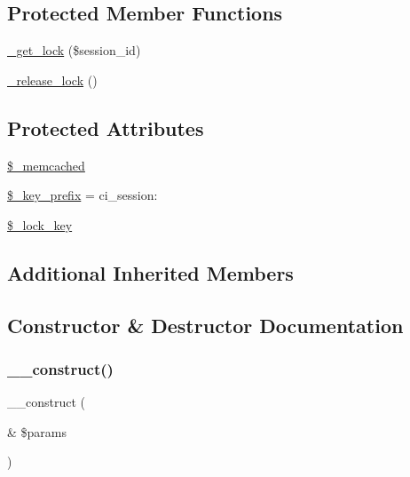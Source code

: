\subsection*{Protected Member Functions}
\begin{DoxyCompactItemize}
\item 
\mbox{\hyperlink{class_c_i___session__memcached__driver_a2c49c8e23be3e2aca96a9d20de18ffc2}{\+\_\+get\+\_\+lock}} (\$session\+\_\+id)
\item 
\mbox{\hyperlink{class_c_i___session__memcached__driver_a0265e356e6cf1eaba229663c1664c37d}{\+\_\+release\+\_\+lock}} ()
\end{DoxyCompactItemize}
\subsection*{Protected Attributes}
\begin{DoxyCompactItemize}
\item 
\mbox{\hyperlink{class_c_i___session__memcached__driver_a9ce5188201bbc41ed4374947a35dadcc}{\$\+\_\+memcached}}
\item 
\mbox{\hyperlink{class_c_i___session__memcached__driver_a177f231cc2eec31d9aa8f50f9ec9b407}{\$\+\_\+key\+\_\+prefix}} = \textquotesingle{}ci\+\_\+session\+:\textquotesingle{}
\item 
\mbox{\hyperlink{class_c_i___session__memcached__driver_a79bf61cb0768c7bb23404280ae004fb4}{\$\+\_\+lock\+\_\+key}}
\end{DoxyCompactItemize}
\subsection*{Additional Inherited Members}


\subsection{Constructor \& Destructor Documentation}
\mbox{\label{class_c_i___session__memcached__driver_ac1669c73d53d6f16cf5459a1e84d39c8}} 
\subsubsection{\texorpdfstring{\+\_\+\+\_\+construct()}{\_\_construct()}}
{\footnotesize\ttfamily \+\_\+\+\_\+construct (\begin{DoxyParamCaption}\item[{\&}]{\$params }\end{DoxyParamCaption})}

